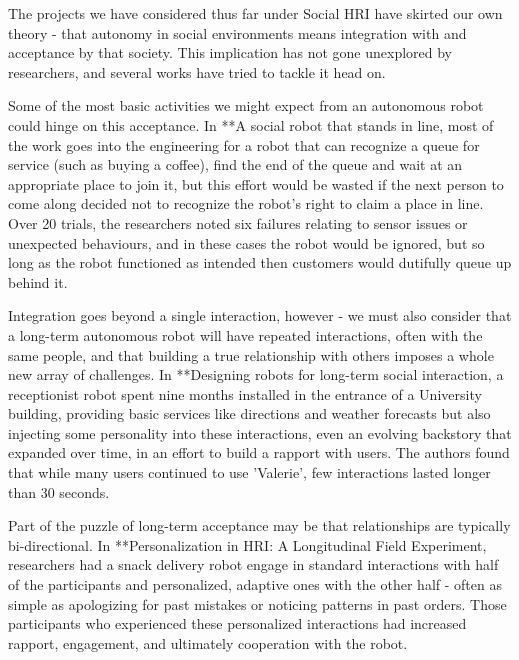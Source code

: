\documentclass{sfuthesis}
\begin{document}
The projects we have considered thus far under Social HRI have skirted our own theory - that autonomy in social environments means integration with and acceptance by that society. This implication has not gone unexplored by researchers, and several works have tried to tackle it head on.


Some of the most basic activities we might expect from an autonomous robot could hinge on this acceptance. In **A social robot that stands in line, most of the work goes into the engineering for a robot that can recognize a queue for  service (such as buying a coffee), find the end of the queue and wait at an appropriate place to join it, but this effort would be wasted if the next person to come along decided not to recognize the robot's right to claim a place in line. Over 20 trials, the researchers noted six failures relating to sensor issues or unexpected behaviours, and in these cases the robot would be ignored, but so long as the robot functioned as intended then customers would dutifully queue up behind it.

Integration goes beyond a single interaction, however - we must also consider that a long-term autonomous robot will have repeated interactions, often with the same people, and that building a true relationship with others imposes a whole new array of challenges. In **Designing robots for long-term social interaction, a receptionist robot spent nine months installed in the entrance of a University building, providing basic services like directions and weather forecasts but also injecting some personality into these interactions, even an evolving backstory that expanded over time, in an effort to build a rapport with users. The authors found that while many users continued to use 'Valerie', few interactions lasted longer than 30 seconds.

Part of the puzzle of long-term acceptance may be that relationships are typically bi-directional. In **Personalization in HRI: A Longitudinal Field Experiment, researchers had a snack delivery robot engage in standard interactions with half of the participants and personalized, adaptive ones with the other half - often as simple as apologizing for past mistakes or noticing patterns in past orders. Those participants who experienced these personalized interactions had increased rapport, engagement, and ultimately cooperation with the robot.
\end{document}
